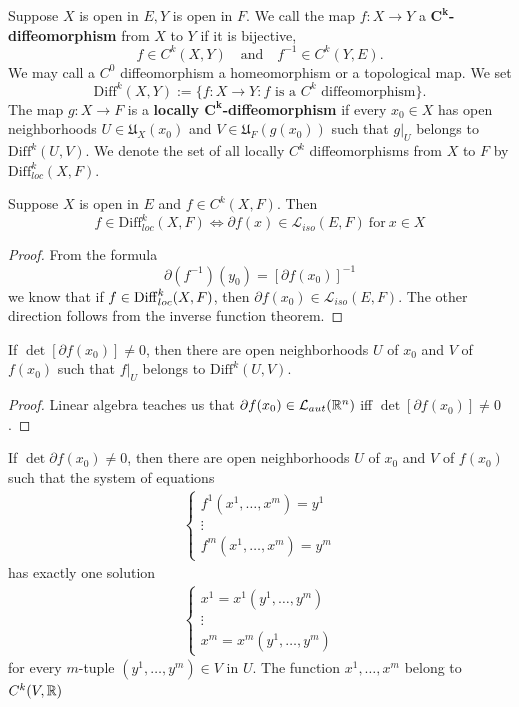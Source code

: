 \begin{definition}
Suppose $X$ is open in $E,Y$ is open in $F$. We call the map $f:X\to Y$ a \textbf{$\bm{C^k}$-diffeomorphism} from $X$ to $Y$ if it is bijective,
\[f \in C^k(X,Y)\quad\text{and}\quad f^{-1}\in C^k(Y,E).\]
We may call a $C^0$ diffeomorphism a homeomorphism or a topological map. We set
\[\mathrm{Diff}^k(X,Y):=\{f:X\to Y:f \text{ is a $C^k$ diffeomorphism}\}.\]
The map $g:X\to F$ is a \textbf{locally $\bm{C^k}$-diffeomorphism} if every $x_0\in X$ has open neighborhoods $U\in\mathfrak{U}_X(x_0)$ and $V\in\mathfrak{U}_F(g(x_0))$ such that $g|_U$ belongs to $\mathrm{Diff}^k(U,V)$. We denote the set of all locally $C^k$ diffeomorphisms from $X$ to $F$ by $\mathrm{Diff}^k_{loc}(X,F)$.
\end{definition}
\begin{corollary}
Suppose $X$ is open in $E$ and $f\in C^k(X,F)$. Then
\[f\in\mathrm{Diff}^k_{loc}(X,F)\iff \partial f(x)\in \mathcal{L}_{iso}(E,F)\ \text{for}\ x\in X\]
\end{corollary}
\begin{proof}
From the formula 
\[\partial(f^{-1})(y_0)=[\partial f(x_0)]^{-1}\]
we know that if $f\in\mathrm{Diff}^k_{loc}(X,F)$, then $\partial f(x_0)\in\mathcal{L}_{iso}(E,F)$. The other direction follows from the inverse function theorem.
\end{proof}
\begin{theorem}
If $\det[\partial f(x_0)]\neq 0$, then there are open neighborhoods $U$ of $x_0$ and $V$ of $f(x_0)$ such that $f|_U$ belongs to $\mathrm{Diff}^k(U,V)$.
\end{theorem}
\begin{proof}
Linear algebra teaches us that $\partial f(x_0)\in\mathcal{L}_{aut}(\mathbb{R}^n)$ iff $\det[\partial f(x_0)]\neq 0$.
\end{proof}
\begin{corollary}
If $\det\partial f(x_0)\neq 0$, then there are open neighborhoods $U$ of $x_0$
and $V$ of $f(x_0)$ such that the system of equations
\begin{align}
\left\{
\begin{array}{c}
f^1(x^1,\dots,x^m)=y^1\\
\vdots\\
f^m(x^1,\dots,x^m)=y^m
\end{array}\right. \end{align}
has exactly one solution
\begin{align}
\left\{
\begin{array}{c}
x^1=x^1(y^1,\dots,y^m)\\
\vdots\\
x^m=x^m(y^1,\dots,y^m)
\end{array}\right. 
\end{align}
for every $m$-tuple $(y^1,\dots,y^m)\in V$ in $U$. The function $x^1,\dots,x^m$ belong to $C^k(V,\mathbb{R})$
\end{corollary}
